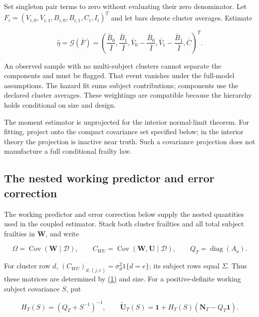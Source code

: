\documentclass[11pt]{article}
\begin{document}
Set singleton pair terms to zero without evaluating their zero denominator. Let \(F_i=(V_{i,0},V_{i,1},B_{i,0},B_{i,1},C_i,I_i)^T\) and let bars denote cluster averages. Estimate

\begin{equation*}
\widehat\eta=\mathcal G(\bar F)=
\left(\frac{\bar B_0}{\bar I},\frac{\bar B_1}{\bar I},
\bar V_0-\frac{\bar B_0}{\bar I},
\bar V_1-\frac{\bar B_1}{\bar I},\bar C\right)^T.
\tag{13}\label{eq:13}
\end{equation*}

An observed sample with no multi-subject clusters cannot separate the components and must be flagged. That event vanishes under the full-model assumptions. The hazard fit sums subject contributions; components use the declared cluster averages. These weightings are compatible because the hierarchy holds conditional on size and design.

The moment estimator is unprojected for the interior normal-limit theorem. For fitting, project onto the compact covariance set specified below; in the interior theory the projection is inactive near truth. Such a covariance projection does not manufacture a full conditional frailty law.

\subsection{The nested working predictor and error correction}\label{sec:3.3}

The working predictor and error correction below supply the nested quantities used in the coupled estimator. Stack both cluster frailties and all total subject frailties in \(\mathbf W\), and write

\begin{equation*}
\Omega=\operatorname{Cov}(\mathbf W\mid\mathcal D),\qquad
C_{WU}=\operatorname{Cov}(\mathbf W,\mathbf U\mid\mathcal D),\qquad
Q_T=\operatorname{diag}(A_a).
\tag{14}\label{eq:14}
\end{equation*}

For cluster row \(d\), \((C_{WU})_{d,(j,e)}=\sigma_d^2 1\{d=e\}\); its subject rows equal \(\Sigma\). Thus these matrices are determined by \hyperref[eq:1]{(1)} and size. For a positive-definite working subject covariance \(S\), put

\begin{equation*}
H_T(S)=(Q_T+S^{-1})^{-1},\qquad
\widetilde{\mathbf U}_T(S)=\mathbf1+H_T(S)(\mathbf N_T-Q_T\mathbf1).
\tag{15}\label{eq:15}
\end{equation*}
\end{document}
